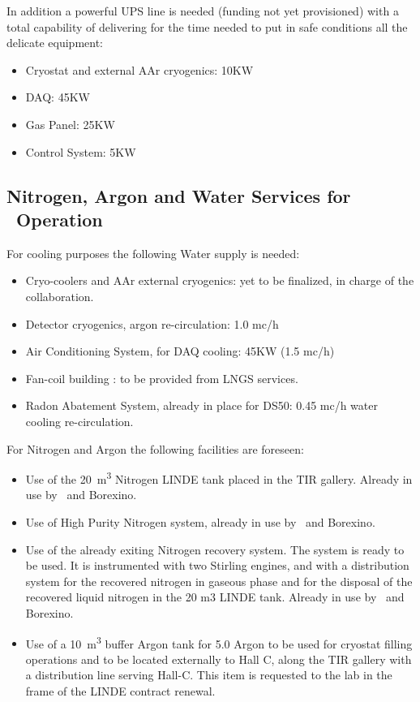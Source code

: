 In addition a powerful UPS line is needed (funding not yet provisioned) with a total capability of delivering \TotalUPSPowerConsumption for the time needed to put in safe conditions all the delicate equipment: 
\begin{itemize}
\item Cryostat and external AAr cryogenics: 10KW
\item DAQ: 45KW 
\item Gas Panel: 25KW 
\item Control System: 5KW 
\end{itemize}

\subsection{Nitrogen, Argon and Water Services for \DSks\ Operation}
\label{sec:NitrogenArgonAndWater}

For cooling purposes the following Water supply is needed:
\begin{itemize} 
\item Cryo-coolers and AAr external cryogenics: yet to be finalized, in charge of the collaboration. 
\item Detector cryogenics, argon re-circulation: 1.0 mc/h 
\item Air Conditioning System, for DAQ cooling: 45KW (1.5 mc/h)
\item Fan-coil building : to be provided from LNGS services.
\item Radon Abatement System, already in place for DS50: 0.45 mc/h water cooling re-circulation.
\end{itemize} 

\vspace{\baselineskip}

For Nitrogen and Argon the following facilities are foreseen:
\begin{itemize}
\item Use of the \SI{20}{\cubic\meter} Nitrogen LINDE tank placed in the TIR gallery. Already in use by \DSf\ and Borexino. 
\item Use of High Purity Nitrogen system, already in use by \DSf\ and Borexino.
\item Use of the already exiting Nitrogen recovery system. The system is  ready to be used. It is instrumented with two Stirling engines, and with a distribution system for the recovered nitrogen in gaseous phase and for the disposal of the recovered liquid nitrogen in the 20 m3 LINDE tank. Already in use by \DSf\ and Borexino.
\item Use of a \SI{10}{\cubic\meter} buffer Argon tank for 5.0 Argon to be used for cryostat filling operations and to be located externally to Hall C, along the TIR gallery with a distribution line serving Hall-C. This item is requested to the lab in the frame of the LINDE contract renewal.  
\end{itemize}

